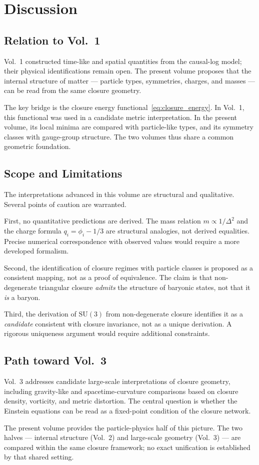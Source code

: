 \section{Discussion}
\label{sec:discussion}

\subsection{Relation to Vol.\ 1}

Vol.~1 constructed time-like and spatial quantities from the causal-log model;
their physical identifications remain open. The present volume proposes that
the internal structure of matter ---
particle types, symmetries, charges, and masses ---
can be read from the same closure geometry.

The key bridge is the closure energy functional~\eqref{eq:closure_energy}.
In Vol.~1, this functional was used in a candidate metric interpretation.
In the present volume, its local minima are compared with particle-like types,
and its symmetry classes with gauge-group structure.
The two volumes thus share a common geometric foundation.

\subsection{Scope and Limitations}

The interpretations advanced in this volume are structural and qualitative.
Several points of caution are warranted.

First, no quantitative predictions are derived.
The mass relation $m \propto 1/\Delta^2$ and the charge formula $q_i = \phi_i - 1/3$
are structural analogies, not derived equalities.
Precise numerical correspondence with observed values
would require a more developed formalism.

Second, the identification of closure regimes with particle classes is proposed
as a consistent mapping, not as a proof of equivalence.
The claim is that non-degenerate triangular closure \emph{admits}
the structure of baryonic states, not that it \emph{is} a baryon.

Third, the derivation of $\mathrm{SU}(3)$ from non-degenerate closure
identifies it as a \emph{candidate} consistent with closure invariance,
not as a unique derivation.
A rigorous uniqueness argument would require additional constraints.

\subsection{Path toward Vol.\ 3}

Vol.~3 addresses candidate large-scale interpretations of closure geometry,
including gravity-like and spacetime-curvature comparisons based on closure
density, vorticity, and metric distortion.
The central question is whether the Einstein equations
can be read as a fixed-point condition of the closure network.

The present volume provides the particle-physics half of this picture.
The two halves --- internal structure (Vol.~2) and large-scale geometry
(Vol.~3) --- are compared within the same closure framework; no exact
unification is established by that shared setting.
